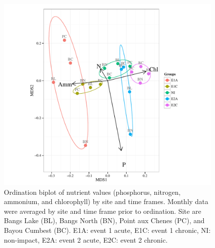 \documentclass[letterpaper,12pt]{article}\usepackage[]{graphicx}\usepackage[]{color}
\makeatletter
\def\maxwidth{ %
  \ifdim\Gin@nat@width>\linewidth
    \linewidth
  \else
    \Gin@nat@width
  \fi
}
\makeatother
\begin{document}
\begin{figure}[!ht]

{\centering \includegraphics[width=\maxwidth]{figs/ordfig-1} 

}

\caption[Ordination biplot of nutrient values (phosphorus, nitrogen, ammonium, and chlorophyll) by site and time frames]{Ordination biplot of nutrient values (phosphorus, nitrogen, ammonium, and chlorophyll) by site and time frames. Monthly data were averaged by site and time frame prior to ordination.  Site are Bangs Lake (BL), Bangs North (BN), Point aux Chenes (PC), and Bayou Cumbest (BC). E1A: event 1 acute, E1C: event 1 chronic, NI: non-impact, E2A: event 2 acute, E2C: event 2 chronic.}\label{fig:ordfig}
\end{figure}


\clearpage
\end{document}
